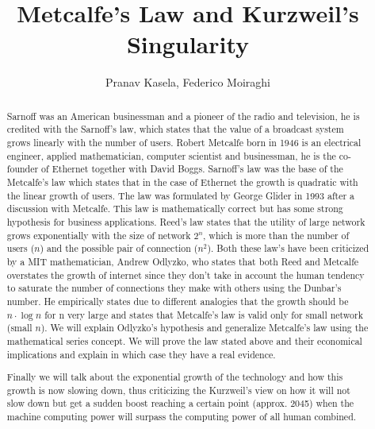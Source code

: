\documentclass[12pt, a4page]{article}
\title{Metcalfe's Law and Kurzweil's Singularity}
\date{}
\author{Pranav Kasela, Federico Moiraghi}
\begin{document}
\maketitle
\begin{abstract}
Sarnoff was an American businessman and a pioneer of the radio and television, he is credited with the Sarnoff’s law, which states that the value of a broadcast system grows linearly with the number of users.
Robert Metcalfe born in 1946 is an electrical engineer, applied mathematician, computer scientist and businessman, he is the co-founder of Ethernet together with David Boggs.\newline
Sarnoff’s law was the base of the Metcalfe’s law which states that in the case of Ethernet the growth is quadratic with the linear growth of users. The law was formulated by George Glider in 1993 after a discussion with Metcalfe. This law is mathematically correct but has some strong hypothesis for business applications. \newline
Reed’s law states that the utility of large network grows exponentially with the size of network $2^n$, which is more than the number of users ($n$) and the possible pair of connection ($n^2$).
Both these law’s have been criticized by a MIT mathematician, Andrew Odlyzko, who states that both Reed and Metcalfe overstates the growth of internet since they don’t take in account the human tendency to saturate the number of connections they make with others using the Dunbar’s number. He empirically states due to different analogies that the growth should be $n\cdot \log n$ for n very large and states that Metcalfe’s law is valid only for small network (small $n$). We will explain Odlyzko’s hypothesis and generalize Metcalfe’s law using the mathematical series concept.\newline
We will prove the law stated above and their economical implications and explain in which case they have a real evidence.

Finally we will talk about the exponential growth of the technology and how this growth is now slowing down, thus criticizing the Kurzweil's view on how it will not slow down but get a sudden boost reaching a certain point (approx. 2045) when the machine computing power will surpass the computing power of all human combined.
\end{abstract}
\end{document}
